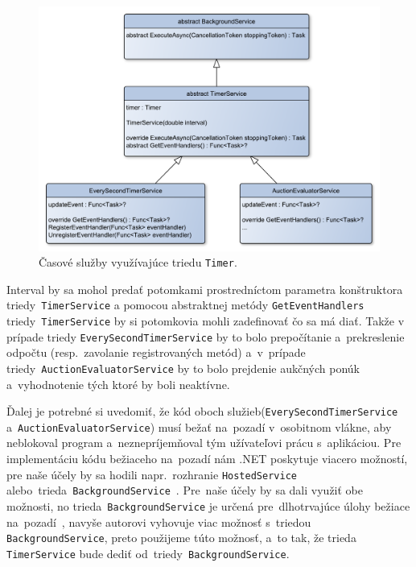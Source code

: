 \begin{figure}[H]\centering
\includegraphics[width=140mm]{../img/timer services uml}
\caption{Časové služby využívajúce triedu \texttt{Timer}.}
\label{timer services uml}
\end{figure}

Interval by sa mohol predať potomkami prostredníctom parametra konštruktora triedy~\verb|TimerService| a pomocou abstraktnej metódy \verb|GetEventHandlers| triedy~\verb|TimerService| by si potomkovia mohli zadefinovať čo sa má diať. Takže v prípade triedy \verb|EverySecondTimerService| by to bolo prepočítanie a~prekreslenie odpočtu (resp.~zavolanie registrovaných metód) a~v~prípade triedy~\verb|AuctionEvaluatorService| by to bolo prejdenie aukčných ponúk a~vyhodnotenie tých ktoré by boli neaktívne.

Ďalej je potrebné si uvedomiť, že kód oboch služieb\linebreak (\verb|EverySecondTimerService| a~\verb|AuctionEvaluatorService|) musí bežať na~pozadí v~osobitnom vlákne, aby neblokoval program a~neznepríjemňoval tým užívateľovi prácu s~aplikáciou. Pre implementáciu kódu bežiaceho na~pozadí nám .NET poskytuje viacero možností, pre naše účely by sa hodili napr.~rozhranie \texttt{HostedService}~\cite{hosted service} alebo~trieda~\texttt{BackgroundService}~\cite{background service}. Pre~naše účely by sa dali využiť obe možnosti, no trieda~\verb|BackgroundService| je určená pre~dlhotrvajúce úlohy bežiace na~pozadí~\cite{background service for long running tasks}, navyše autorovi vyhovuje viac možnosť s~triedou \verb|BackgroundService|, preto použijeme túto možnosť, a~to tak, že trieda \verb|TimerService| bude dediť od~triedy~\verb|BackgroundService|.

